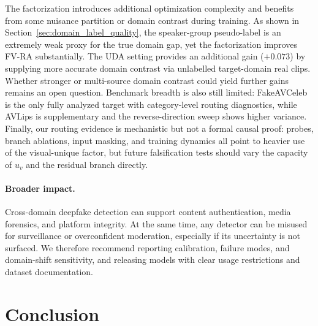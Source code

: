 \documentclass{article}
\begin{document}
The factorization introduces additional optimization complexity and benefits from some nuisance partition or domain contrast during training. As shown in Section~\ref{sec:domain_label_quality}, the speaker-group pseudo-label is an extremely weak proxy for the true domain gap, yet the factorization improves FV-RA substantially. The UDA setting provides an additional gain ($+0.073$) by supplying more accurate domain contrast via unlabelled target-domain real clips. Whether stronger or multi-source domain contrast could yield further gains remains an open question. Benchmark breadth is also still limited: FakeAVCeleb is the only fully analyzed target with category-level routing diagnostics, while AVLips is supplementary and the reverse-direction sweep shows higher variance. Finally, our routing evidence is mechanistic but not a formal causal proof: probes, branch ablations, input masking, and training dynamics all point to heavier use of the visual-unique factor, but future falsification tests should vary the capacity of $u_v$ and the residual branch directly.

\paragraph{Broader impact.}
Cross-domain deepfake detection can support content authentication, media forensics, and platform integrity. At the same time, any detector can be misused for surveillance or overconfident moderation, especially if its uncertainty is not surfaced. We therefore recommend reporting calibration, failure modes, and domain-shift sensitivity, and releasing models with clear usage restrictions and dataset documentation.

\section{Conclusion}
\end{document}
